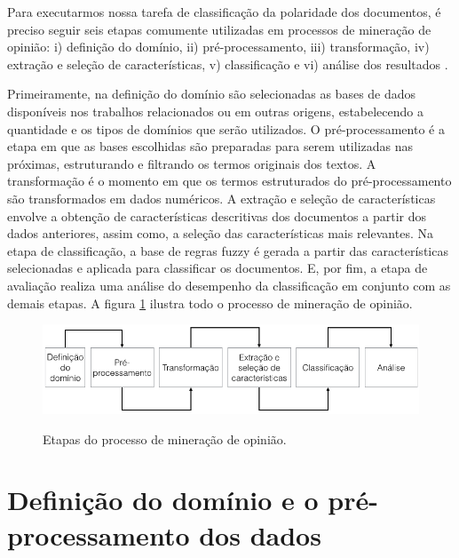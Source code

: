 \documentclass[template.tex]{subfiles}
\begin{document}

Para executarmos nossa tarefa de classificação da polaridade dos documentos, é preciso seguir seis etapas comumente utilizadas em processos de mineração de opinião: i) definição do domínio, ii) pré-processamento, iii) transformação, iv) extração e seleção de características, v) classificação e vi) análise dos resultados \cite{moraes2012document}.

Primeiramente, na definição do domínio são selecionadas as bases de dados disponíveis nos trabalhos relacionados ou em outras origens, estabelecendo a quantidade e os tipos de domínios que serão utilizados. O pré-processamento é a etapa em que as bases escolhidas são preparadas para serem utilizadas nas próximas, estruturando e filtrando os termos originais dos textos. A transformação é o momento em que os termos estruturados do pré-processamento são transformados em dados numéricos. A extração e seleção de características envolve a obtenção de características descritivas dos documentos a partir dos dados anteriores, assim como, a seleção das características mais relevantes. Na etapa de classificação, a base de regras fuzzy é gerada a partir das características selecionadas e aplicada para classificar os documentos. E, por fim, a etapa de avaliação realiza uma análise do desempenho da classificação em conjunto com as demais etapas. A figura \ref{figura:processo_mineracao} ilustra todo o processo de mineração de opinião.

\begin{figure}[h]
\caption{Etapas do processo de mineração de opinião.}
\centering
\includegraphics[scale=0.55]{opinion_mining_process_2.png}
\label{figura:processo_mineracao}
\end{figure}

\section{Definição do domínio e o pré-processamento dos dados}
\end{document}
